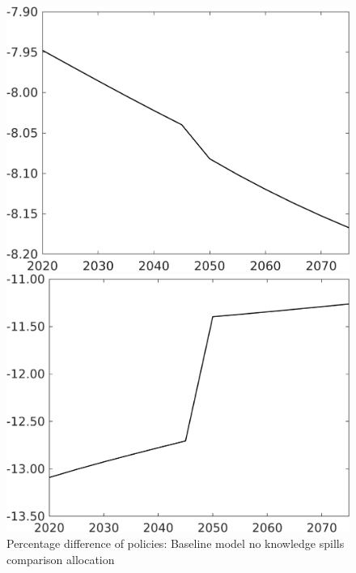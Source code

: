 \documentclass[12pt]{article}
\begin{document}
\begin{figure}[h!!]
	\centering
	\caption{Percentage difference of policies: Baseline model no knowledge spills comparison allocation}\label{fig:Pertauf_nsk0_xgr0_noknow2}
	
	\begin{minipage}[]{0.32\textwidth}
		\includegraphics[width=1\textwidth]{../../codding_model/own_basedOnFried/optimalPol_010922_revision/figures/all_13Sept22/CompTaufPER_bytaul_Reg0_N_spillover0_nsk0_xgr0_knspil1_sep1_LFlimit1_emsbase0_countec0_GovRev0_etaa0.79_lgd0.png}
	\end{minipage}	
	\begin{minipage}[]{0.32\textwidth}
		\includegraphics[width=1\textwidth]{../../codding_model/own_basedOnFried/optimalPol_010922_revision/figures/all_13Sept22/CompTaufPER_bytaul_Reg0_G_spillover0_nsk0_xgr0_knspil1_sep1_LFlimit1_emsbase0_countec0_GovRev0_etaa0.79_lgd0.png}

\end{minipage}
\end{figure}
\end{document}
